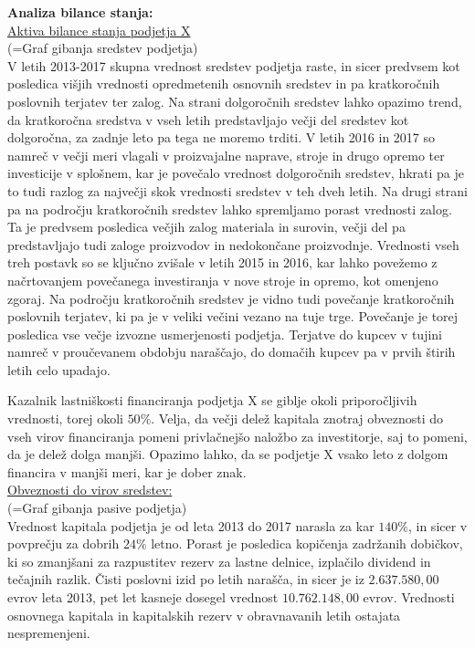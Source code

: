 \documentclass[12pt,a4paper]{amsart}
\theoremstyle{definition} %
\theoremstyle{plain} %
\begin{document}
\textbf{Analiza bilance stanja:}\\
\underline{Aktiva bilance stanja podjetja X}\\
(=Graf gibanja sredstev podjetja)\\
V letih 2013-2017 skupna vrednost sredstev podjetja raste, in sicer predvsem kot posledica višjih vrednosti opredmetenih osnovnih sredstev in pa kratkoročnih poslovnih terjatev ter zalog. Na strani dolgoročnih sredstev lahko opazimo trend, da kratkoročna sredstva v vseh letih predstavljajo večji del sredstev kot dolgoročna, za zadnje leto pa tega ne moremo trditi. V letih 2016 in 2017 so namreč v večji meri vlagali v proizvajalne naprave, stroje in drugo opremo ter investicije v splošnem, kar je povečalo vrednost dolgoročnih sredstev, hkrati pa je to tudi razlog za največji skok vrednosti sredstev v teh dveh letih. Na drugi strani pa na področju kratkoročnih sredstev lahko spremljamo porast vrednosti zalog. Ta je predvsem posledica večjih zalog materiala in surovin, večji del pa predstavljajo tudi zaloge proizvodov in nedokončane proizvodnje. Vrednosti vseh treh postavk so se ključno zvišale v letih 2015 in 2016, kar lahko povežemo z načrtovanjem povečanega investiranja v nove stroje in opremo, kot omenjeno zgoraj. Na področju kratkoročnih sredstev je vidno tudi povečanje kratkoročnih poslovnih terjatev, ki pa je v veliki večini vezano na tuje trge. Povečanje je torej posledica vse večje izvozne usmerjenosti podjetja. Terjatve do kupcev v tujini namreč v proučevanem obdobju naraščajo, do domačih kupcev pa v prvih štirih letih celo upadajo.  \par
Kazalnik lastniškosti financiranja podjetja X se giblje okoli priporočljivih vrednosti, torej okoli $50\%$. Velja, da večji delež kapitala znotraj obveznosti do vseh virov financiranja pomeni privlačnejšo naložbo za investitorje, saj to pomeni, da je delež dolga manjši. Opazimo lahko, da se podjetje X vsako leto z dolgom financira v manjši meri, kar je dober znak.\\
\underline{Obveznosti do virov sredstev:}\\
(=Graf gibanja pasive podjetja)\\
Vrednost kapitala podjetja je od leta 2013 do 2017 narasla za kar $140\%$, in sicer v povprečju za dobrih $24\%$ letno. Porast je posledica kopičenja zadržanih dobičkov, ki so zmanjšani za razpustitev rezerv za lastne delnice, izplačilo dividend in tečajnih razlik. Čisti poslovni izid po letih narašča, in sicer je iz $2.637.580,00$ evrov leta 2013, pet let kasneje dosegel vrednost $10.762.148,00$ evrov. Vrednosti osnovnega kapitala in kapitalskih rezerv v obravnavanih letih ostajata nespremenjeni.\\
\end{document}
